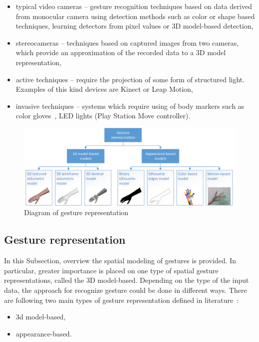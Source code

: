 \begin{itemize}

\item typical video cameras -- gesture recognition techniques based on data derived from monocular camera using detection methods such as color or shape based techniques, learning detectors from pixel values or 3D model-based detection,

\item stereocameras -- techniques based on captured images from two cameras, which provide an approximation of the recorded data to a 3D model representation,

\item active techniques -- require the projection of some form of structured light. Examples of this kind devices are Kinect or Leap Motion,

\item invasive techniques -- systems which require using of body markers such as color gloves~\cite{Wang:2009:RHC:1531326.1531369}, LED lights (Play Station Move controller).

\end{itemize}

\begin{figure}[htb]
\centering
 \includegraphics[width=1\columnwidth]{figures/gestureRepresentations.png}
 \caption[]{Diagram of gesture representation}
 \label{gesturerepresentations}
\end{figure}

\subsection{Gesture representation}
In this Subsection, overview the spatial modeling of gestures is provided. In particular, greater importance is placed on one type of spatial gesture representations, called the 3D model-based. Depending on the type of the input data, the approach for recognize gesture could be done in different ways.
There are following two main types of gesture representation defined in literature~\cite{Huang95handgesture}\cite{Pavlovic97visualinterpretation}:
\begin{itemize}
\item 3d model-based,
\item appearance-based.
\end{itemize}

